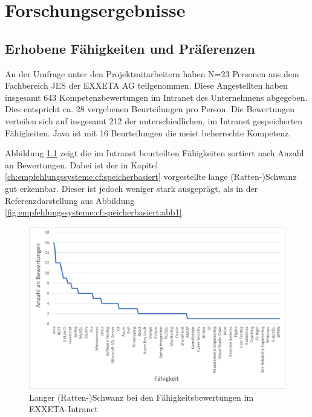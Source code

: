 \chapter{Forschungsergebnisse}
\label{ch:ergebnisse}

\section{Erhobene Fähigkeiten und Präferenzen}
\label{ch:ergebnisse:analyse}
An der Umfrage unter den Projektmitarbeitern haben N=23 Personen aus dem Fachbereich \acl{JES} der EXXETA AG teilgenommen. Diese Angestellten haben insgesamt 643 Kompetenzbewertungen im Intranet des Unternehmens abgegeben. Dies entspricht ca. 28 vergebenen Beurteilungen pro Person. Die Bewertungen verteilen sich auf insgesamt 212 der \anzFaehigkeiten unterschiedlichen, im Intranet gespeicherten Fähigkeiten. Java ist mit 16 Beurteilungen die meist beherrschte Kompetenz.

Abbildung \ref{fig:ergebnisse:analyse:abb1} zeigt die im Intranet beurteilten Fähigkeiten sortiert nach Anzahl an Bewertungen. Dabei ist der in Kapitel \ref{ch:empfehlungssysteme:cf:speicherbasiert} vorgestellte lange (Ratten-)Schwanz gut erkennbar. Dieser ist jedoch weniger stark ausgeprägt, als in der Referenzdarstellung aus Abbildung \ref{fig:empfehlungssysteme:cf:speicherbasiert:abb1}.

\begin{figure}[h]
	\centering
	\includegraphics[width=1\textwidth]{gfx/long-tail-intranet.png}
	\caption{Langer (Ratten-)Schwanz bei den Fähigkeitsbewertungen im EXXETA-Intranet}
	\label{fig:ergebnisse:analyse:abb1}
\end{figure}

